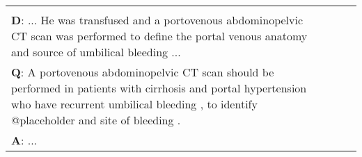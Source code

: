 \documentclass[11pt,a4paper]{article}
\begin{document}
\begin{table}[t]
\begin{tabular}{p{2.7cm} p{1.8cm} l r}
{\begin{comment}
ad and neck . 10  as well as being sporadic , hamartomas can present as a part of a syndrome . epithelial hamartomas can be a part of cronkhite – canada syndrome or orofacial digital syndrome , 11 whereas neuromuscular and vascular hamartomas may become apparent in crohn 's \
disease . 12  oral neurovascular hamartomas present as smooth surfaced exophytic lesions usually less than 1 cm in diameter . being pedunculated or wide based , their colour may range from pink to yellow . they are painless lesions leading to general discomfort in the patien\
t .  histologically , there is no clear boundary between the lesions and the surrounding normal structures as they are non-encapsulated and poorly circumscribed . composed of hypocellular connective tissue containing aggregates of loose vessels closely packed with small to m\
edium sized nerve bundles , they are not easily distinguishable from the surrounding non-hamartomatous tissues . these nerve bundles are reactive with s - 100 protein . this feature can be easily used as a criterion for diagnosis while examining . 13 this reactivity was also\
 pivotal in our case to reach the final diagnosis . distinction from quite a few oral benign lesions is still hard . oral neurovascular hamartomas resemble traumatic hamartomas and can be distinguished based on the fact that the blood vessels in the former are very closely e\
ntwined with the neural component . in traumatic neuromas the two components are separate .  once the diagnosis is confirmed the clinical management comprises of surgical excision . local excision is curative ; a management plan similar to most benign oral lesions . a recurr\
ence only follows an incomplete excision and one should not mistake it with malignant transformation . 14 close clinical follow - up is absolutely essential . the literature does not say much regarding local recurrence of oral neurovascular hamartomas but oral mesenchymal ha\
martomas arising from the cheek have a reported local recurrence rate of 20 cal presentation and treatment plan .

@placeholder cures the disease and recurrence is only in cases of incomplete resection .

surgical excision


\section*{Appendix: Examples}
Query uses paraphrasing, with a guideline tone:\\
\textbf{D}: ... He was transfused and a portovenous abdominopelvic CT scan was performed to define the portal venous anatomy and source of umbilical bleeding ...\\
\textbf{Q}: A portovenous abdominopelvic CT scan should be performed in patients with cirrhosis and portal hypertension who have recurrent umbilical bleeding , to identify @placeholder and site of bleeding .\\
\textbf{A}: ...


\end{comment}}
\end{tabular}
\end{table}
\end{document}
